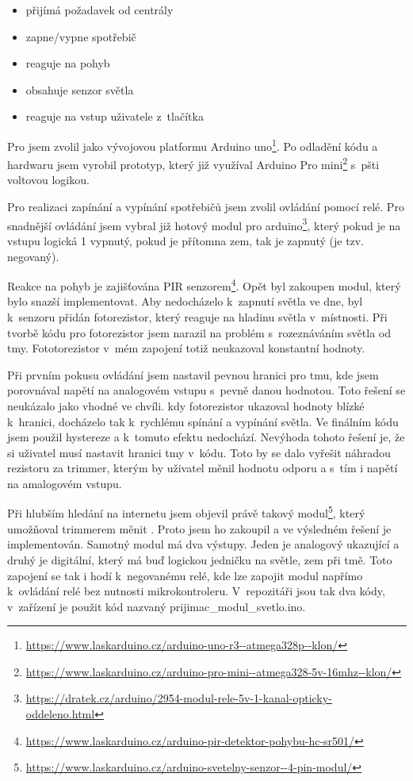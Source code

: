\documentclass[11pt,a4paper,twoside,openright]{report}
\begin{document}
	\begin{itemize}
		\item přijímá požadavek od centrály
		\item zapne/vypne spotřebič
		\item reaguje na pohyb
		\item obsahuje senzor světla 
		\item reaguje na vstup uživatele z~tlačítka
	\end{itemize}
	
	Pro  jsem zvolil jako vývojovou platformu Arduino uno\footnote{\url{https://www.laskarduino.cz/arduino-uno-r3--atmega328p--klon/}}. Po odladění kódu a hardwaru jsem vyrobil prototyp, který již využíval Arduino Pro mini\footnote{\url{https://www.laskarduino.cz/arduino-pro-mini--atmega328-5v-16mhz--klon/}} s~pšti voltovou logikou. 
	
	
	Pro realizaci zapínání a vypínání spotřebičů jsem zvolil ovládání pomocí relé. Pro snadnější ovládání jsem vybral již hotový modul pro arduino\footnote{\url{https://dratek.cz/arduino/2954-modul-rele-5v-1-kanal-opticky-oddeleno.html}}, který pokud je na vstupu logická 1 vypnutý, pokud je přítomna zem, tak je zapnutý (je tzv. negovaný).
	
	
	Reakce na pohyb je zajišťována PIR senzorem\footnote{\url{https://www.laskarduino.cz/arduino-pir-detektor-pohybu-hc-sr501/}}. Opět byl zakoupen modul, který bylo snazší implementovat. Aby nedocházelo k~zapnutí světla ve dne, byl k~senzoru přidán fotorezistor, který reaguje na hladinu světla v~místnosti. Při tvorbě kódu pro fotorezistor jsem narazil na problém s~rozeznáváním světla od tmy. Fototorezistor v~mém zapojení totiž neukazoval konstantní hodnoty.
	
	
	Při prvním pokusu ovládání jsem nastavil pevnou hranici pro tmu, kde jsem porovnával napětí na analogovém vstupu s~pevně danou hodnotou. Toto řešení se neukázalo jako vhodné ve chvíli. kdy fotorezistor ukazoval hodnoty blízké k~hranici, docházelo tak k~rychlému spínání a vypínání světla. Ve finálním kódu jsem použil hystereze a k~tomuto efektu nedochází. Nevýhoda tohoto řešení je, že si uživatel musí nastavit hranici tmy v~kódu. Toto by se dalo vyřešit náhradou rezistoru za trimmer, kterým by uživatel měnil hodnotu odporu a s~tím i napětí na amalogovém vstupu.
	
	
	Při hlubším hledání na internetu jsem objevil právě takový modul\footnote{\url{https://www.laskarduino.cz/arduino-svetelny-senzor--4-pin-modul/}}, který umožňoval trimmerem měnit . Proto jsem ho zakoupil a ve výsledném řešení je implementován. Samotný modul má dva výstupy. Jeden je analogový ukazující  a druhý je digitální, který má buď logickou jedničku na světle, zem při tmě. Toto zapojení se tak i hodí k~negovanému relé, kde lze zapojit modul napřímo k~ovládání relé bez nutnosti mikrokontroleru. V~repozitáři jsou tak dva kódy, v~zařízení je použit kód nazvaný prijimac\_modul\_svetlo.ino.
	
\end{document}
